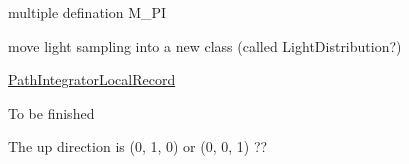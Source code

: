 \begin{DoxyRefList}
\item[Member \mbox{\hyperlink{_common_8h_ae71449b1cc6e6250b91f539153a7a0d3}{M\+\_\+\+PI}} ]\label{todo__todo000007}%
%
multiple defination M\+\_\+\+PI  
\item[Member \mbox{\hyperlink{class_path_integrator_ab4d7071e1c8e56d42a51a64f624bcaf6}{Path\+Integrator\+::choose\+One\+Light}} (std\+::shared\+\_\+ptr$<$ Scene $>$ scene, const Intersection \&its, const \mbox{\hyperlink{struct_ray}{Ray}} \&ray, double light\+Sample)]\label{todo__todo000013}%
%
move light sampling into a new class (called Light\+Distribution?)  
\item[Class \mbox{\hyperlink{struct_path_integrator_local_record}{Path\+Integrator\+Local\+Record}} ]\label{todo__todo000012}%
%
\mbox{\hyperlink{struct_path_integrator_local_record}{Path\+Integrator\+Local\+Record}}  
\item[Class \mbox{\hyperlink{class_r_g_b_spectrum}{RGBSpectrum}} ]\label{todo__todo000001}%
%
To be finished  
\item[File \mbox{\hyperlink{_warp_8h}{Warp.h}} ]\label{todo__todo000010}%
%
The up direction is (0, 1, 0) or (0, 0, 1) ?? 
\end{DoxyRefList}